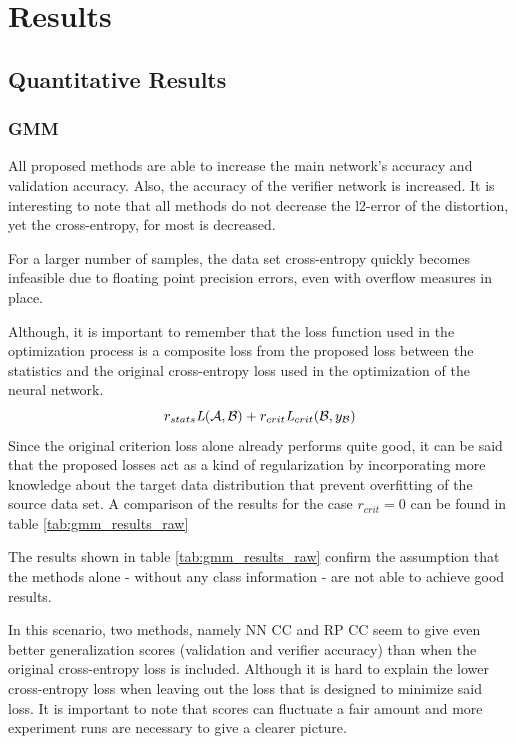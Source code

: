 \section{Results}

\subsection{Quantitative Results}

\subsubsection{GMM}

All proposed methods are able to increase the main network's accuracy and validation accuracy.
Also, the accuracy of the verifier network is increased.
It is interesting to note that all methods do not decrease the l2-error of the distortion,
yet the cross-entropy, for most is decreased.

For a larger number of samples, the data set cross-entropy quickly becomes infeasible
due to floating point precision errors, even with overflow measures in place.

Although, it is important to remember that the loss function used in the optimization process
is a composite loss from the proposed loss between the statistics
and the original cross-entropy loss used in the optimization of the neural network.
\[
    r_{stats} \textit{L}(\mathcal A, \mathcal B) + r_{crit}\textit{L}_{crit}(\mathcal B, y_{\mathcal B})
\]
Since the original criterion loss alone already performs quite good, 
it can be said that the proposed losses act as a kind of regularization 
by incorporating more knowledge about the target data distribution that prevent overfitting
of the source data set.
A comparison of the results for the case $r_{crit}=0$ can be found in table \ref{tab:gmm_results_raw}

The results shown in table \ref{tab:gmm_results_raw} confirm the assumption that the methods alone 
- without any class information - are not able to achieve good results.

In this scenario, two methods, namely NN CC and RP CC seem to give even better generalization scores 
(validation and verifier accuracy) than when the original cross-entropy loss is included.
Although it is hard to explain the lower cross-entropy loss when leaving out the loss that
is designed to minimize said loss.
It is important to note that scores can fluctuate a fair amount and more experiment runs are
necessary to give a clearer picture.

